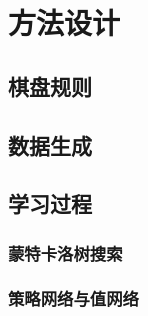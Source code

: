 \chapter{方法设计}
\label{chap:algorithm}

\section{棋盘规则}

\section{数据生成}

\section{学习过程}

\subsection{蒙特卡洛树搜索}

\subsection{策略网络与值网络}